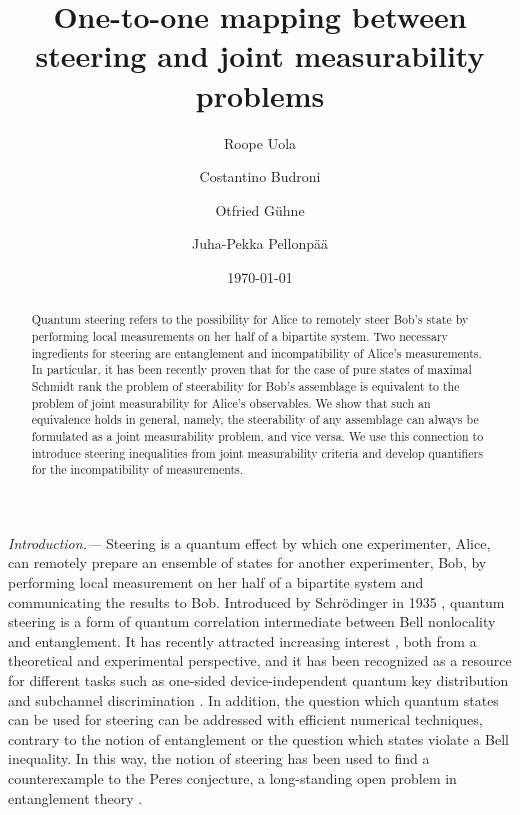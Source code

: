 \documentclass[10pt,twocolumn,aps,prl,nobibnotes,showpacs,superscriptaddress,floatfix]{revtex4-1}
\theoremstyle{definition}
\begin{document}
\title{One-to-one mapping between steering and joint measurability problems}
\author{Roope Uola}
\author{Costantino Budroni}
\author{Otfried G\"uhne}
\author{Juha-Pekka Pellonp\"{a}\"{a}} 
\date{ \today}

\begin{abstract}
Quantum steering refers to the possibility for Alice to remotely 
steer Bob's state by performing local measurements on her half 
of a bipartite system. Two necessary ingredients for steering 
are entanglement and incompatibility of Alice's measurements. 
In particular, it has been recently proven that for the 
case of pure states of maximal Schmidt rank the problem of 
steerability for Bob's assemblage is equivalent to the problem 
of joint measurability for Alice's observables. We show that such an
equivalence holds in general, namely, the steerability of any 
assemblage can always be formulated as a joint measurability 
problem, and vice versa. We use this connection to introduce 
steering inequalities from joint measurability criteria and 
develop quantifiers for the incompatibility of measurements.
\end{abstract}

\maketitle

{\it Introduction.---}
Steering is a quantum effect by which one experimenter, Alice, can remotely prepare an ensemble of states for another experimenter, Bob, by performing local measurement on her half of a bipartite system and communicating the results to Bob. Introduced by Schr\"odinger in 1935 \cite{Schr35}, quantum steering is a form of quantum correlation intermediate between Bell nonlocality and entanglement. It has recently attracted increasing interest \cite{wiseman2007, SNC14, pusey2014,jevtic2014,Milne14,Kogias15}, both from a theoretical and experimental perspective, and it has been recognized as a resource for different tasks such as one-sided device-independent quantum key distribution \cite{Branc12,He13} and subchannel discrimination \cite{Piani15}. In addition, the question which 
quantum states can be used for steering can be addressed with efficient 
numerical techniques, contrary to the notion of entanglement or the question 
which states violate a Bell inequality. In this way, the notion of steering
has been used to find a counterexample to the Peres conjecture, 
a long-standing open problem in entanglement theory \cite{moroderperes2014, vertesiperes2014}.
\end{document}
